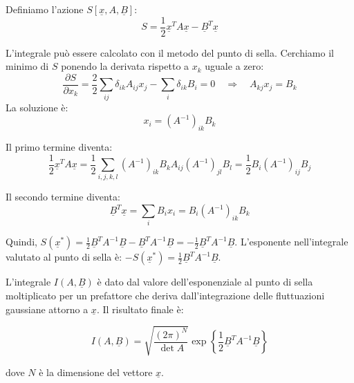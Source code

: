 Definiamo l'azione $S[\underline{x}, A, \underline{B}]$:
\begin{equation}
S = \frac{1}{2} \underline{x}^T A \underline{x} - \underline{B}^T \underline{x}
\end{equation}

L'integrale può essere calcolato con il metodo del punto di sella. Cerchiamo il minimo di $S$ ponendo la derivata rispetto a $x_k$ uguale a zero:
\begin{equation}
\frac{\partial S}{\partial x_k} = \frac{2}{2}\sum_{ij} \delta_{ik} A_{ij} x_j - \sum_{i} \delta_{ik}  B_i = 0 \quad \Rightarrow \quad A_{kj} x_j = B_k
\end{equation}
La soluzione è:
\begin{equation} 
x_i = (A^{-1})_{ik} B_k  
\label{eq:sella_gaussiana}
\end{equation}

Il primo termine diventa:
\begin{equation}
\frac{1}{2}\underline{x}^{T}A\underline{x} = \frac{1}{2}\sum_{i,j,k,l} (A^{-1})_{ik}B_k A_{ij} (A^{-1})_{jl}B_l = \frac{1}{2} B_i (A^{-1})_{ij}B_j 
\end{equation}

Il secondo termine diventa:
\begin{equation} 
\underline{B}^T\underline{x} = \sum_i B_i x_i = B_i (A^{-1})_{ik}B_k 
\end{equation}

Quindi, $S(\underline{x}^*) = \frac{1}{2}\underline{B}^T A^{-1}\underline{B} - \underline{B}^T A^{-1}\underline{B} = -\frac{1}{2}\underline{B}^T A^{-1}\underline{B}$.
L'esponente nell'integrale valutato al punto di sella è: $-S(\underline{x}^*) = \frac{1}{2}\underline{B}^T A^{-1}\underline{B}$.

L'integrale $I(A,\underline{B})$ è dato dal valore dell'esponenziale al punto di sella moltiplicato per un prefattore che deriva dall'integrazione delle fluttuazioni gaussiane attorno a $\underline{x}$. Il risultato finale è:
\begin{tcolorbox}[
    colback=colorA!5,      
    colframe=colorA,       
    arc=3mm,               
    boxrule=1.2pt
]
\begin{equation}
I(A, \underline{B}) = \sqrt{\frac{(2\pi)^N}{\det A}} \exp \left\{ \frac{1}{2} \underline{B}^T A^{-1} \underline{B} \right\}
\end{equation}
\end{tcolorbox}
dove $N$ è la dimensione del vettore $\underline{x}$.


